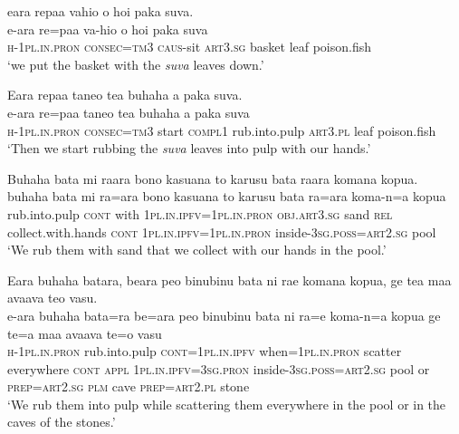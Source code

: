 \ea\label{ex:text29-9}
eara repaa vahio o hoi paka suva.\\
\gll e-ara	re=paa	va-hio	o	hoi	paka	suva\\
     \textsc{h}-1\textsc{pl}.\textsc{in}.\textsc{pron}	\textsc{consec}=\textsc{tm}3	\textsc{caus}-sit	\textsc{art}3.\textsc{sg}	basket	leaf	poison.fish\\
\glt `we put the basket with the \textit{suva} leaves down.'
\z

\newpage
\ea\label{ex:text29-10}
Eara repaa taneo tea buhaha a paka suva.\\
\gll e-ara	re=paa	taneo	tea	buhaha	a	paka	suva\\
     \textsc{h}-1\textsc{pl}.\textsc{in}.\textsc{pron}	\textsc{consec}=\textsc{tm}3	start	\textsc{compl}1	rub.into.pulp	\textsc{art}3.\textsc{pl}	leaf	poison.fish\\
\glt `Then we start rubbing the \textit{suva} leaves into pulp with our hands.'
\z

\ea\label{ex:text29-11}
Buhaha bata mi raara bono kasuana to karusu bata raara komana kopua.\\
\gll buhaha	bata	mi	ra=ara	bono	kasuana	to	karusu	bata	ra=ara	koma-n=a	kopua\\
     rub.into.pulp	\textsc{cont}	with	1\textsc{pl}.\textsc{in}.\textsc{ipfv}=1\textsc{pl}.\textsc{in}.\textsc{pron}	\textsc{obj}.\textsc{art}3.\textsc{sg}	sand	\textsc{rel}	collect.with.hands	\textsc{cont}	1\textsc{pl}.\textsc{in}.\textsc{ipfv}=1\textsc{pl}.\textsc{in}.\textsc{pron}	inside-3\textsc{sg}.\textsc{poss}=\textsc{art}2.\textsc{sg}	pool\\
\glt `We rub them with sand that we collect with our hands in the pool.'
\z

\ea\label{ex:text29-12}
Eara buhaha batara, beara peo binubinu bata ni rae komana kopua, ge tea maa avaava teo vasu.\\
\gll e-ara	buhaha	bata=ra	be=ara	peo	binubinu	bata	ni	ra=e	koma-n=a	kopua	ge	te=a	maa	avaava	te=o	vasu\\
     \textsc{h}-1\textsc{pl}.\textsc{in}.\textsc{pron}	rub.into.pulp	\textsc{cont}=1\textsc{pl}.\textsc{in}.\textsc{ipfv}	when=1\textsc{pl}.\textsc{in}.\textsc{pron}	scatter	everywhere	\textsc{cont}	\textsc{appl}	1\textsc{pl}.\textsc{in}.\textsc{ipfv}=3\textsc{sg}.\textsc{pron}	inside-3\textsc{sg}.\textsc{poss}=\textsc{art}2.\textsc{sg}	pool	or	\textsc{prep}=\textsc{art}2.\textsc{sg}	\textsc{plm}	cave	\textsc{prep}=\textsc{art}2.\textsc{pl}	stone\\
\glt `We rub them into pulp while scattering them everywhere in the pool or in the caves of the stones.'
\z

